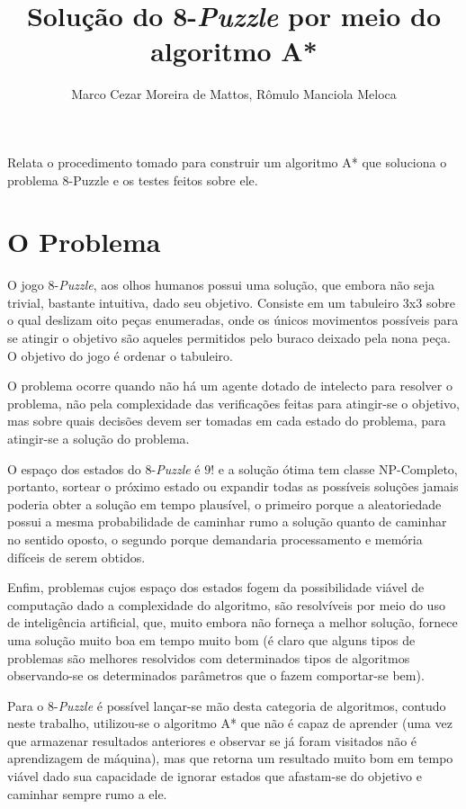 \documentclass[12pt]{article}
\title{Solução do 8-\textit{Puzzle} por meio do algoritmo A*}
\author{Marco Cezar Moreira de Mattos\inst{1}, Rômulo Manciola Meloca\inst{1}}
\begin{document}
	\maketitle

	\begin{resumo}
		Relata o procedimento tomado para construir um algoritmo A* que soluciona o problema 8-Puzzle e os testes feitos sobre ele.
	\end{resumo}

	\section{O Problema}\label{sec:problema}

		O jogo 8-\textit{Puzzle}, aos olhos humanos possui uma solução, que embora não seja trivial, bastante intuitiva, dado seu objetivo. Consiste em um tabuleiro 3x3 sobre o qual deslizam oito peças enumeradas, onde os únicos movimentos possíveis para se atingir o objetivo são aqueles permitidos pelo buraco deixado pela nona peça. O objetivo do jogo é ordenar o tabuleiro.

		O problema ocorre quando não há um agente dotado de intelecto para resolver o problema, não pela complexidade das verificações feitas para atingir-se o objetivo, mas sobre quais decisões devem ser tomadas em cada estado do problema, para atingir-se a solução do problema.

		O espaço dos estados do 8-\textit{Puzzle} é $9!$ e a solução ótima tem classe NP-Completo, portanto, sortear o próximo estado ou expandir todas as possíveis soluções jamais poderia obter a solução em tempo plausível, o primeiro porque a aleatoriedade possui a mesma probabilidade de caminhar rumo a solução quanto de caminhar no sentido oposto, o segundo porque demandaria processamento e memória difíceis de serem obtidos.

		Enfim, problemas cujos espaço dos estados fogem da possibilidade viável de computação dado a complexidade do algoritmo, são resolvíveis por meio do uso de inteligência artificial, que, muito embora não forneça a melhor solução, fornece uma solução muito boa em tempo muito bom (é claro que alguns tipos de problemas são melhores resolvidos com determinados tipos de algoritmos observando-se os determinados parâmetros que o fazem comportar-se bem).

		Para o 8-\textit{Puzzle} é possível lançar-se mão desta categoria de algoritmos, contudo neste trabalho, utilizou-se o algoritmo A* que não é capaz de aprender (uma vez que armazenar resultados anteriores e observar se já foram visitados não é aprendizagem de máquina), mas que retorna um resultado muito bom em tempo viável dado sua capacidade de ignorar estados que afastam-se do objetivo e caminhar sempre rumo a ele.
\end{document}
